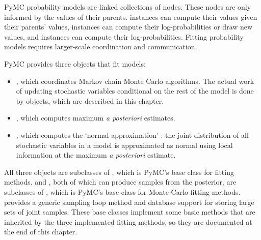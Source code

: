 PyMC probability models are linked collections of nodes. These nodes are only informed by the values of their parents.  instances can compute their values given their parents' values,  instances can compute their log-probabilities or draw new values, and  instances can compute their log-probabilities. Fitting probability models requires larger-scale coordination and communication.

PyMC provides three objects that fit models:
\begin{itemize}
    \item {}, which coordinates Markov chain Monte Carlo algorithms. The actual work of updating stochastic variables conditional on the rest of the model is done by  objects, which are described in this chapter.
    \item {}, which computes maximum \emph{a posteriori} estimates.
    \item {}, which computes the `normal approximation' \citep{gelman}: the joint distribution of all stochastic variables in a model is approximated as normal using local information at the maximum \emph{a posteriori} estimate.
\end{itemize}

All three objects are subclasses of , which is PyMC's base class for fitting methods.  and , both of which can produce samples from the posterior, are subclasses of , which is PyMC's base class for Monte Carlo fitting methods.  provides a generic sampling loop method and database support for storing large sets of joint samples. These base classes implement some basic methods that are inherited by the three implemented fitting methods, so they are documented at the end of this chapter. %

